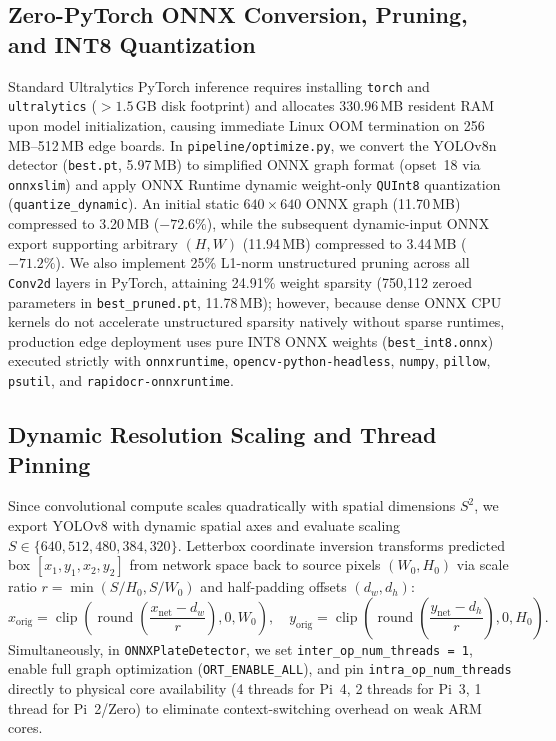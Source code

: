 \documentclass[pdflatex,sn-mathphys-num]{sn-jnl}
\begin{document}
\subsection{Zero-PyTorch ONNX Conversion, Pruning, and INT8 Quantization}\label{subsec:compression}
Standard Ultralytics PyTorch inference requires installing \texttt{torch} and \texttt{ultralytics} ($>1.5$\,GB disk footprint) and allocates 330.96\,MB resident RAM upon model initialization, causing immediate Linux OOM termination on 256\,MB--512\,MB edge boards. In \texttt{pipeline/optimize.py}, we convert the YOLOv8n detector (\texttt{best.pt}, 5.97\,MB) to simplified ONNX graph format (opset~18 via \texttt{onnxslim}) and apply ONNX Runtime dynamic weight-only \texttt{QUInt8} quantization (\texttt{quantize\_dynamic}). An initial static $640\times 640$ ONNX graph (11.70\,MB) compressed to 3.20\,MB ($-72.6\%$), while the subsequent dynamic-input ONNX export supporting arbitrary $(H, W)$ (11.94\,MB) compressed to 3.44\,MB ($-71.2\%$). We also implement 25\% L1-norm unstructured pruning across all \texttt{Conv2d} layers in PyTorch, attaining 24.91\% weight sparsity (750,112 zeroed parameters in \texttt{best\_pruned.pt}, 11.78\,MB); however, because dense ONNX CPU kernels do not accelerate unstructured sparsity natively without sparse runtimes, production edge deployment uses pure INT8 ONNX weights (\texttt{best\_int8.onnx}) executed strictly with \texttt{onnxruntime}, \texttt{opencv-python-headless}, \texttt{numpy}, \texttt{pillow}, \texttt{psutil}, and \texttt{rapidocr-onnxruntime}.

\subsection{Dynamic Resolution Scaling and Thread Pinning}\label{subsec:scaling}
Since convolutional compute scales quadratically with spatial dimensions $S^2$, we export YOLOv8 with dynamic spatial axes and evaluate scaling $S \in \{640, 512, 480, 384, 320\}$. Letterbox coordinate inversion transforms predicted box $[x_1, y_1, x_2, y_2]$ from network space back to source pixels $(W_0, H_0)$ via scale ratio $r = \min(S/H_0, S/W_0)$ and half-padding offsets $(d_w, d_h)$:
\begin{equation}
    x_{\text{orig}} = \operatorname{clip}\!\left(\operatorname{round}\!\left(\frac{x_{\text{net}} - d_w}{r}\right), 0, W_0\right), \quad
    y_{\text{orig}} = \operatorname{clip}\!\left(\operatorname{round}\!\left(\frac{y_{\text{net}} - d_h}{r}\right), 0, H_0\right).
\end{equation}
Simultaneously, in \texttt{ONNXPlateDetector}, we set \texttt{inter\_op\_num\_threads = 1}, enable full graph optimization (\texttt{ORT\_ENABLE\_ALL}), and pin \texttt{intra\_op\_num\_threads} directly to physical core availability (4 threads for Pi~4, 2 threads for Pi~3, 1 thread for Pi~2/Zero) to eliminate context-switching overhead on weak ARM cores.
\end{document}
